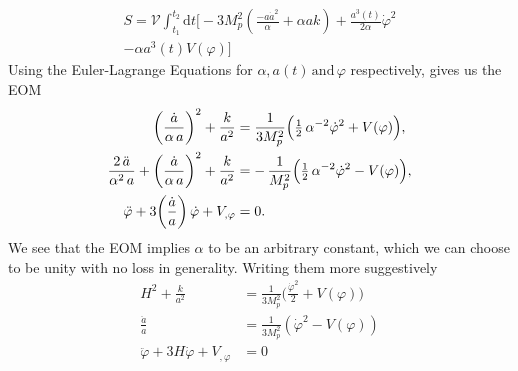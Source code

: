\documentclass[aps,prd,reprint,preprintnumbers,showpacs,floatfix,nofootinbib,superscript address]{revtex4-2}
\begin{document}
\begin{align}
    S = \mathcal{V} \int_{t_1}^{t_2} \mathrm{d}t \big[-3M_p^2 \left( \frac{- a \dot{a}^2}{\alpha} + \alpha ak\right)+  \frac{ a^3(t)}{2\alpha} \dot{\varphi}^2 \nonumber \\
    - \alpha a^3(t) V(\varphi) \big]    
\end{align}
Using the Euler-Lagrange Equations for $\alpha, a(t) \, \text{and} \, \varphi$ respectively, gives us the EOM
\begin{subequations}
    \begin{align}
          \left(\frac{\dot a}{\alpha\,a}\right)^2 + \frac{k}{a^2}
          &= \frac{1}{3M_p^2}\Bigl(\tfrac12\,\alpha^{-2}\dot\varphi^2 + V(\varphi)\Bigr),
          \\
          \frac{2\,\ddot a}{\alpha^2\,a}
          + \left(\frac{\dot a}{\alpha\,a}\right)^2
          + \frac{k}{a^2}
          &= -\,\frac{1}{M_p^2}\Bigl(\tfrac12\,\alpha^{-2}\dot\varphi^2 - V(\varphi)\Bigr),
          \\
          \ddot\varphi + 3\!\left(\frac{\dot a}{a}\right)\dot\varphi
          + V_{,\varphi}
          &= 0. 
    \end{align}
\end{subequations}
We see that the EOM implies $\alpha$ to be an arbitrary constant, which we can choose to be unity with no loss in generality. Writing them more suggestively
\begin{align}
    H^2 + \frac{k}{a^2} &= \frac{1}{3M_p^2} \bigg( \frac{\dot{\varphi}^2}{2} + V(\varphi) \bigg) \label{First 1} \\
    \frac{ \ddot{a}}{a}  &=  \frac{1}{3M_p^2}\left(\dot{\varphi}^2 - V(\varphi) \right) \label{First 2} \\
    \ddot{\varphi} + 3H\dot{\varphi} + V_{,\varphi} &= 0    \label{KGEOM}
\end{align}
\end{document}
